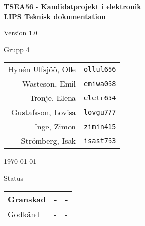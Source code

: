 \documentclass[11pt]{article}
\begin{document}
\begin{titlepage}
\begin{center}

{\Large\bfseries TSEA56 - Kandidatprojekt i elektronik \\ LIPS Teknisk dokumentation}

\vspace{5em}

Version 1.0

\vspace{5em}
Grupp 4 \\
\begin{tabular}{rl}
Hynén Ulfsjöö, Olle&\verb+ollul666+
\\
Wasteson, Emil&\verb+emiwa068+
\\
Tronje, Elena&\verb+eletr654+
\\
Gustafsson, Lovisa&\verb+lovgu777+
\\
Inge, Zimon&\verb+zimin415+
\\
Strömberg, Isak&\verb+isast763+
\\
\end{tabular}

\vspace{5em}
\today

\vspace{16em}
Status
\begin{longtable}{|l|l|l|} \hline

Granskad & - & - \\ \hline
Godkänd & - & - \\ \hline
 
\end{longtable}

\end{center}
\end{titlepage}
\end{document}
